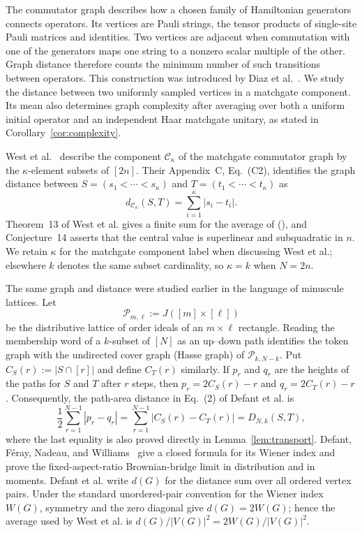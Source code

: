 \documentclass[twoside,10pt]{article}
\numberwithin{equation}{section}
\theoremstyle{slbody}
\theoremstyle{definition}
\theoremstyle{remark}
\newcommand{\1}{\mathbf{1}}
\renewcommand{\eqref}[1]{%
  \textup{{\normalfont(\oldstylenums{\ref{#1}}}\normalfont)}}
\begin{document}
The commutator graph describes how a chosen family of Hamiltonian generators
connects operators.  Its vertices are Pauli strings, the tensor products of
single-site Pauli matrices and identities.  Two vertices are adjacent when
commutation with one of the generators maps one string to a nonzero scalar
multiple of the other.  Graph distance therefore counts the minimum number
of such transitions between operators.  This construction was introduced by
Diaz et al.~\cite[Supplemental Definition~6]{DiazEtAl}.
We study the distance between two uniformly sampled vertices in a matchgate
component.  Its mean also determines graph complexity after averaging over
both a uniform initial operator and an independent Haar matchgate unitary,
as stated in Corollary~\ref{cor:complexity}.

West et al.~\cite[Section~IV and Appendix~C]{WestEtAl} describe the component
$\mathcal C_\kappa$ of the matchgate commutator graph by the $\kappa$-element
subsets of $[2n]$.  Their
Appendix~C, Eq.~(C2), identifies the graph distance between
$S=(s_1<\cdots<s_\kappa)$ and $T=(t_1<\cdots<t_\kappa)$ as
\begin{equation}\label{eq:matching-distance}
 d_{\mathcal C_\kappa}(S,T)=\sum_{i=1}^{\kappa}|s_i-t_i|.
\end{equation}
Theorem~13 of West et al. gives a finite sum for the average of
\eqref{eq:matching-distance}, and Conjecture~14 asserts that the central value
is superlinear and subquadratic in $n$.
We retain $\kappa$ for the matchgate component label when discussing West et
al.; elsewhere $k$ denotes the same subset cardinality, so $\kappa=k$ when
$N=2n$.

The same graph and distance were studied earlier in the language of minuscule
lattices.  Let
\[
 \mathcal P_{m,\ell}:=J([m]\times[\ell])
\]
be the distributive lattice of order ideals of an $m\times\ell$ rectangle.
Reading the membership word of a $k$-subset of $[N]$ as an up--down path
identifies the token graph with the undirected cover graph (Hasse graph) of
$\mathcal P_{k,N-k}$.  Put $C_S(r):=|S\cap[r]|$ and define $C_T(r)$
similarly.  If $p_r$ and $q_r$ are the heights of the paths for $S$ and $T$
after $r$ steps, then $p_r=2C_S(r)-r$ and $q_r=2C_T(r)-r$.  Consequently,
the path-area distance in Eq.~(2) of Defant et al. is
\[
 \frac12\sum_{r=1}^{N-1}|p_r-q_r|
 =\sum_{r=1}^{N-1}|C_S(r)-C_T(r)|
 =D_{N,k}(S,T),
\]
where the last equality is also proved directly in
Lemma~\ref{lem:transport}.  Defant, F\'eray, Nadeau, and
Williams~\cite[Corollary~3 and Proposition~5]{DefantEtAl} give a
closed formula for its Wiener index and prove the fixed-aspect-ratio
Brownian-bridge limit in distribution and in moments.  Defant et al. write
$d(G)$ for the distance sum over all ordered vertex pairs.  Under the standard
unordered-pair convention for the Wiener index $W(G)$, symmetry and the zero
diagonal give $d(G)=2W(G)$; hence the average used by West et al. is
$d(G)/|V(G)|^2=2W(G)/|V(G)|^2$.
\end{document}

